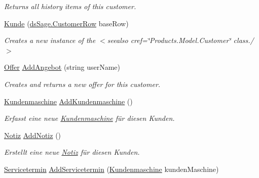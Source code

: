 \begin{DoxyCompactItemize}
\begin{DoxyCompactList}\small\item\em Returns all history items of this customer. \end{DoxyCompactList}\item 
\hyperlink{class_products_1_1_model_1_1_entities_1_1_kunde_a7224cf742d44238b8b59e369ecf89e5b}{Kunde} (\hyperlink{class_products_1_1_data_1_1ds_sage_1_1_customer_row}{ds\+Sage.\+Customer\+Row} base\+Row)
\begin{DoxyCompactList}\small\item\em Creates a new instance of the $<$seealso cref=\char`\"{}\+Products.\+Model.\+Customer\char`\"{} class./$>$ \end{DoxyCompactList}\item 
\hyperlink{class_products_1_1_model_1_1_entities_1_1_offer}{Offer} \hyperlink{class_products_1_1_model_1_1_entities_1_1_kunde_a86aabc1af5dec7e376fe4d434e677409}{Add\+Angebot} (string user\+Name)
\begin{DoxyCompactList}\small\item\em Creates and returns a new offer for this customer. \end{DoxyCompactList}\item 
\hyperlink{class_products_1_1_model_1_1_entities_1_1_kundenmaschine}{Kundenmaschine} \hyperlink{class_products_1_1_model_1_1_entities_1_1_kunde_aa09331704e2ba1ea026e630d9b3745eb}{Add\+Kundenmaschine} ()
\begin{DoxyCompactList}\small\item\em Erfasst eine neue \hyperlink{class_products_1_1_model_1_1_entities_1_1_kundenmaschine}{Kundenmaschine} für diesen Kunden. \end{DoxyCompactList}\item 
\hyperlink{class_products_1_1_model_1_1_entities_1_1_notiz}{Notiz} \hyperlink{class_products_1_1_model_1_1_entities_1_1_kunde_a3783cb1a622ef6ccb61329ed827daaaa}{Add\+Notiz} ()
\begin{DoxyCompactList}\small\item\em Erstellt eine neue \hyperlink{class_products_1_1_model_1_1_entities_1_1_notiz}{Notiz} für diesen Kunden. \end{DoxyCompactList}\item 
\hyperlink{class_products_1_1_model_1_1_entities_1_1_servicetermin}{Servicetermin} \hyperlink{class_products_1_1_model_1_1_entities_1_1_kunde_af872d2a4fba24c94d31911a4b7709a32}{Add\+Servicetermin} (\hyperlink{class_products_1_1_model_1_1_entities_1_1_kundenmaschine}{Kundenmaschine} kunden\+Maschine)

\end{DoxyCompactItemize}
